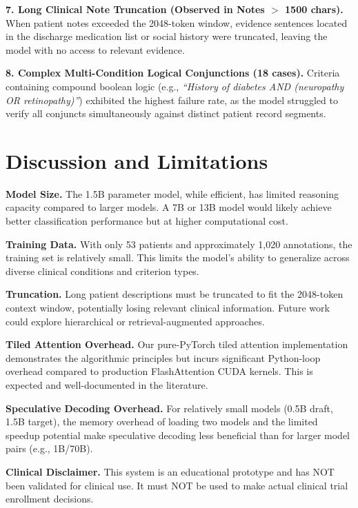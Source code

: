 \documentclass[conference]{IEEEtran}
\begin{document}
\textbf{7. Long Clinical Note Truncation (Observed in Notes $>$ 1500 chars).} When patient notes exceeded the 2048-token window, evidence sentences located in the discharge medication list or social history were truncated, leaving the model with no access to relevant evidence.

\textbf{8. Complex Multi-Condition Logical Conjunctions (18 cases).} Criteria containing compound boolean logic (e.g., \textit{``History of diabetes AND (neuropathy OR retinopathy)''}) exhibited the highest failure rate, as the model struggled to verify all conjuncts simultaneously against distinct patient record segments.

\section{Discussion and Limitations}

\textbf{Model Size.} The 1.5B parameter model, while efficient, has limited reasoning capacity compared to larger models. A 7B or 13B model would likely achieve better classification performance but at higher computational cost.

\textbf{Training Data.} With only 53 patients and approximately 1,020 annotations, the training set is relatively small. This limits the model's ability to generalize across diverse clinical conditions and criterion types.

\textbf{Truncation.} Long patient descriptions must be truncated to fit the 2048-token context window, potentially losing relevant clinical information. Future work could explore hierarchical or retrieval-augmented approaches.

\textbf{Tiled Attention Overhead.} Our pure-PyTorch tiled attention implementation demonstrates the algorithmic principles but incurs significant Python-loop overhead compared to production FlashAttention CUDA kernels. This is expected and well-documented in the literature.

\textbf{Speculative Decoding Overhead.} For relatively small models (0.5B draft, 1.5B target), the memory overhead of loading two models and the limited speedup potential make speculative decoding less beneficial than for larger model pairs (e.g., 1B/70B).

\textbf{Clinical Disclaimer.} This system is an educational prototype and has NOT been validated for clinical use. It must NOT be used to make actual clinical trial enrollment decisions.
\end{document}
